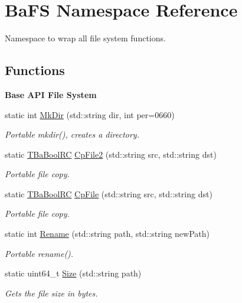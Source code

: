 \hypertarget{namespaceBaFS}{}\section{Ba\+FS Namespace Reference}
\label{namespaceBaFS}


Namespace to wrap all file system functions.  


\subsection*{Functions}
\begin{Indent}\textbf{ Base A\+PI File System}\par
\begin{DoxyCompactItemize}
\item 
static int \hyperlink{namespaceBaFS_a9e6346a9784d4de1dbda3c79ef8bb72b}{Mk\+Dir} (std\+::string dir, int per=0660)
\begin{DoxyCompactList}\small\item\em Portable mkdir(), creates a directory. \end{DoxyCompactList}\item 
static \hyperlink{BaBool_8h_a84d5a0de4729ca4c89f2479c605dbf3d}{T\+Ba\+Bool\+RC} \hyperlink{namespaceBaFS_ac4636cb3d87c93a0c666989f670f7680}{Cp\+File2} (std\+::string src, std\+::string dst)
\begin{DoxyCompactList}\small\item\em Portable file copy. \end{DoxyCompactList}\item 
static \hyperlink{BaBool_8h_a84d5a0de4729ca4c89f2479c605dbf3d}{T\+Ba\+Bool\+RC} \hyperlink{namespaceBaFS_a500756f66ff45aaf311421e7f68a0070}{Cp\+File} (std\+::string src, std\+::string dst)
\begin{DoxyCompactList}\small\item\em Portable file copy. \end{DoxyCompactList}\item 
static int \hyperlink{namespaceBaFS_ad729f83dfe589df3058696c6db6452c9}{Rename} (std\+::string path, std\+::string new\+Path)
\begin{DoxyCompactList}\small\item\em Portable rename(). \end{DoxyCompactList}\item 
static uint64\+\_\+t \hyperlink{namespaceBaFS_ada7d22f6e3458a9db589923cbacfbaca}{Size} (std\+::string path)
\begin{DoxyCompactList}\small\item\em Gets the file size in bytes. \end{DoxyCompactList}\item 

\end{DoxyCompactItemize}
\end{Indent}
